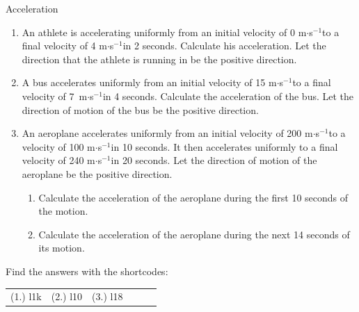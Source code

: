     \noindent
\label{m38794*notfhsst!!!underscore!!!id1812}
	\par
\label{m38794*secfhsst!!!underscore!!!id1815}
\begin{exercises}{Acceleration }
            \nopagebreak \noindent
      \label{m38794*id62523}\begin{enumerate}[noitemsep, label=\textbf{\arabic*}. ] 
            \label{m38794*uid78}\item An athlete is accelerating uniformly from an initial velocity of 0 m$\ensuremath{\cdot}$s${}^{-1}$to a final velocity of 4 m$\ensuremath{\cdot}$s${}^{-1}$in 2 seconds. Calculate his acceleration. Let the direction that the athlete is running in be the positive direction.\newline
\label{m38794*uid79}\item A bus accelerates uniformly from an initial velocity of 15 m$\ensuremath{\cdot}$s${}^{-1}$to a final velocity of 7~m$\ensuremath{\cdot}$s${}^{-1}$in 4 seconds. Calculate the acceleration of the bus. Let the direction of motion of the bus be the positive direction.\newline
\label{m38794*uid80}\item An aeroplane accelerates uniformly from an initial velocity of 200 m$\ensuremath{\cdot}$s${}^{-1}$to a velocity of 100 m$\ensuremath{\cdot}$s${}^{-1}$in 10 seconds. It then accelerates uniformly to a final velocity of 240 m$\ensuremath{\cdot}$s${}^{-1}$in 20 seconds. Let the direction of motion of the aeroplane be the positive direction.
\label{m38794*id68889}\begin{enumerate}[noitemsep, label=\textbf{\alph*}. ] 
            \label{m38794*uid81}\item Calculate the acceleration of the aeroplane during the first 10 seconds of the motion.
\label{m38794*uid82}\item Calculate the acceleration of the aeroplane during the next 14 seconds of its motion.
\end{enumerate}
                \end{enumerate}
  \label{m38794**end}
\par {} Find the answers with the shortcodes:
 \par \begin{tabular}[h]{cccccc}
 (1.) l1k  &  (2.) l10  &  (3.) l18  & \end{tabular}
\end{exercises}
